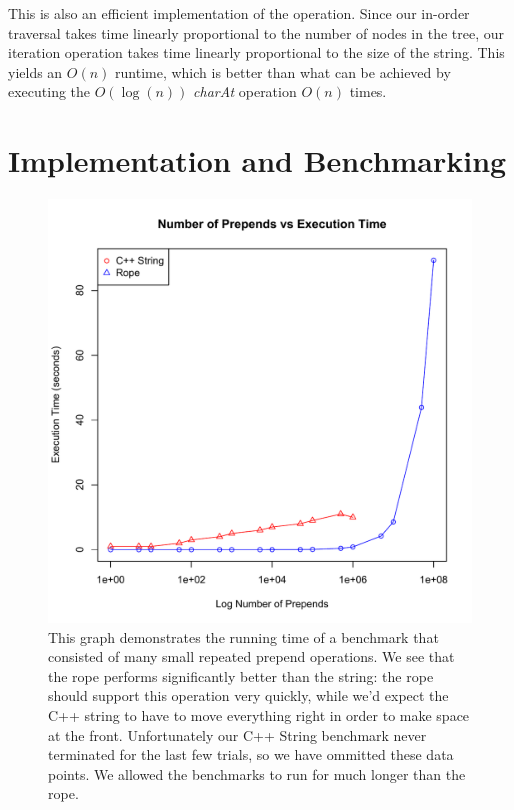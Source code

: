 \documentclass[12pt]{article}
\begin{document}
This is also an efficient implementation of the operation. Since our in-order traversal takes time linearly proportional to the number of nodes in the tree, our iteration operation takes time linearly proportional to the size of the string. This yields an $O(n)$ runtime, which is better than what can be achieved by executing the $O(\log(n))$ \emph{charAt} operation $O(n)$ times.

\section{Implementation and Benchmarking}

\begin{figure}[p]
\begin{centering}
\includegraphics[scale=1.0]{prepends_vs_execution}
\caption{This graph demonstrates the running time of a benchmark that consisted of many small repeated prepend operations. We see that the rope performs significantly better than the string: the rope should support this operation very quickly, while we'd expect the C++ string to have to move everything right in order to make space at the front. Unfortunately our C++ String benchmark never terminated for the last few trials, so we have ommitted these data points. We allowed the benchmarks to run for much longer than the rope.}

\end{centering}
\end{figure}
\end{document}
